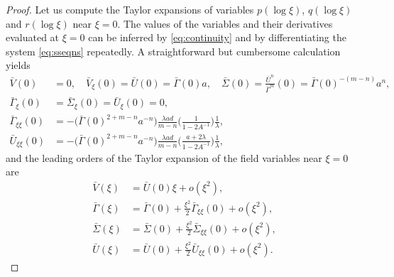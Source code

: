 \documentclass[a4paper,11pt]{article}
\def\bG{\bar{\Gamma}}
\def\bS{\bar{\Sigma}}
\def\bV{\bar{V}}
\def\bU{\bar{U}}
\numberwithin{step}{dummy}
\begin{document}
\begin{proof}
Let us compute the Taylor expansions of variables $p(\log\xi)$, $q(\log\xi)$ and $r(\log\xi)$ near $\xi=0$. 
The values of the variables and their derivatives evaluated at $\xi=0$ can be inferred by \eqref{eq:continuity} and by differentiating the system \eqref{eq:sseqns} repeatedly. 
A straightforward but cumbersome calculation yields
\begin{align*}
 \bar{V}(0)&=0,\quad
 \bar{V}_\xi(0) = \bar{U}(0) = \bar{ \Gamma }(0) a, \quad %
 \bar{ \Sigma }(0) = \frac{ \bar{U}^n }{ \bar{ \Gamma }^m }(0) = \bar{ \Gamma }(0)^{-(m-n)} a^n, \\
 \bar{\Gamma}_{\xi}(0) &= \bar{\Sigma}_{\xi}(0) = \bar{U}_\xi(0) = 0, \\
 \bar{\Gamma}_{\xi\xi}(0) &=-\big(\bG(0)^{2+m-n}a^{-n}\big) \frac{ \lambda ad }{m-n}  \Bigg(\frac{1}{ 1 -  2 A^{-1}}\Bigg)  \frac{1}{ \lambda }, \\
 \bar{U}_{\xi\xi}(0) &=-\big(\bG(0)^{2+m-n}a^{-n}\big) \frac{ \lambda ad}{m-n}  \Bigg(\frac{a+2 \lambda}{ 1 -  2  A^{-1}}\Bigg)  \frac{1}{ \lambda } ,
\end{align*}
and the leading orders of the Taylor expansion of the field variables near $\xi=0$ are 
\begin{align*}
 \bV(\xi) &= \bU(0)\xi + o(\xi^2),\\
 \bG(\xi) &= \bG(0) + \frac{\xi^2}{2} \bG_{\xi\xi}(0) + o(\xi^2), \\
 \bS(\xi) &= \bS(0) + \frac{\xi^2}{2} \bS_{\xi\xi}(0) + o(\xi^2), \\
 \bU(\xi) &= \bU(0) + \frac{\xi^2}{2} \bU_{\xi\xi}(0) + o(\xi^2).
\end{align*}


\end{proof}
\end{document}
